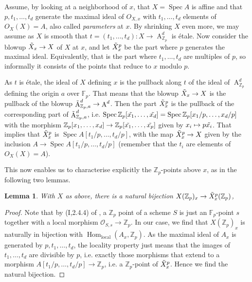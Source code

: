 \documentclass{article}
\newcommand{\Z}{\mathbb{Z}}
\renewcommand{\O}{\mathcal{O}}
\newcommand{\F}{\mathbb{F}}
\DeclareMathOperator{\Hom}{Hom}
\DeclareMathOperator{\Spec}{Spec}
\DeclareMathOperator{\A}{A}
\theoremstyle{plain}
\newtheorem{lem}[thm]{Lemma} %
\theoremstyle{definition}
\theoremstyle{remark}
\begin{document}
Assume, by looking at a neighborhood of $x$, that $X = \Spec A$ is affine and that $p,t_1,\dots,t_d$ generate the maximal ideal of $O_{X,x}$ with $t_1,\dots,t_d$ elements of $O_X(X) = A$, also called \textit{parameters} at $x$. By shrinking $X$ even more, we may assume as $X$ is smooth that $t = (t_1,\dots,t_d): X \to \A^d_{\Z_p}$ is \'etale. Now consider the blowup $\Tilde{X}_x \to X$ of $X$ at $x$, and let $\Tilde{X}_x^p$ be the part where $p$ generates the maximal ideal. Equivalently, that is the part where $t_1,\dots,t_d$ are multiples of $p$, so informally it consists of the points that reduce to $x$ modulo $p$.

As $t$ is \'etale, the ideal of $X$ defining $x$ is the pullback along $t$ of the ideal of $\A^d_{\Z_p}$ defining the origin $a$ over $\F_p$. That means that the blowup $\Tilde{X}_x \to X$ is the pullback of the blowup $\Tilde{\A}^d_{\Z_p,a} \to \A^d$. Then the part $\Tilde{X}_x^p$ is the pullback of the corresponding part of $\Tilde{\A}^d_{\Z_p,a}$, i.e. $\Spec \Z_p[\Tilde{x_1},\dots,\Tilde{x_d}] = \Spec \Z_p[x_1/p,\dots,x_d/p]$ with the morphism $\Z_p[x_1,\dots,x_d] \to \Z_p[\Tilde{x_1},\dots,\tilde{x_p}]$ given by $x_i \mapsto p\Tilde{x_i}$. That implies that $\Tilde{X}_x^p$ is $\Spec A[t_1/p,\dots,t_d/p]$, with the map $\Tilde{X}_x^p \to X$ given by the inclusion $A \to \Spec A[t_1/p,\dots,t_d/p]$ (remember that the $t_i$ are elements of $O_X(X) = A$).

This now enables us to characterise explicitly the $\Z_p$-points above $x$, as in the following two lemmas.

\begin{lem}
With $X$ as above, there is a natural bijection $X(\Z_p)_x \to \Tilde{X}_x^p(\Z_p)$,
\end{lem}
\begin{proof}
Note that by (I,2.4.4) of \cite{ega}, a $\Z_p$ point of a scheme $S$ is just an $\F_p$-point $s$ together with a local morphism $\O_{S,s} \to \Z_p$. In our case, we find that $X(\Z_p)_x$ is naturally in bijection with $\Hom_{\text{local}}(A_x,\Z_p)$. As the maximal ideal of $A_x$ is generated by $p,t_1,\dots,t_d$, the locality property just means that the images of $t_1,\dots,t_d$ are divisible by $p$, i.e. exactly those morphisms that extend to a morphism $A[t_1/p,\dots,t_d/p] \to \Z_p$, i.e. a $\Z_p$-point of $\Tilde{X}_x^p$. Hence we find the natural bijection.
\end{proof}
\end{document}
